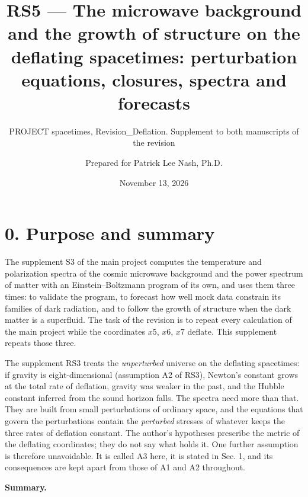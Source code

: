 \documentclass[
  10pt,
]{article}
\title{RS5 --- The microwave background and the growth of structure on
the deflating spacetimes: perturbation equations, closures, spectra and
forecasts}
\subtitle{PROJECT spacetimes, Revision\_Deflation. Supplement to both
manuscripts of the revision}
\author{Prepared for Patrick Lee Nash, Ph.D.}
\date{November 13, 2026}
\begin{document}
\maketitle

\hypertarget{purpose-and-summary}{%
\section{0. Purpose and summary}\label{purpose-and-summary}}

The supplement S3 of the main project computes the temperature and
polarization spectra of the cosmic microwave background and the power
spectrum of matter with an Einstein--Boltzmann program of its own, and
uses them three times: to validate the program, to forecast how well
mock data constrain its families of dark radiation, and to follow the
growth of structure when the dark matter is a superfluid. The task of
the revision is to repeat every calculation of the main project while
the coordinates \(x5\), \(x6\), \(x7\) deflate. This supplement repeats
those three.

The supplement RS3 treats the \emph{unperturbed} universe on the
deflating spacetimes: if gravity is eight-dimensional (assumption A2 of
RS3), Newton's constant grows at the total rate of deflation, gravity
was weaker in the past, and the Hubble constant inferred from the sound
horizon falls. The spectra need more than that. They are built from
small perturbations of ordinary space, and the equations that govern the
perturbations contain the \emph{perturbed} stresses of whatever keeps
the three rates of deflation constant. The author's hypotheses prescribe
the metric of the deflating coordinates; they do not say what holds it.
One further assumption is therefore unavoidable. It is called A3 here,
it is stated in Sec. 1, and its consequences are kept apart from those
of A1 and A2 throughout.

\textbf{Summary.}
\end{document}
